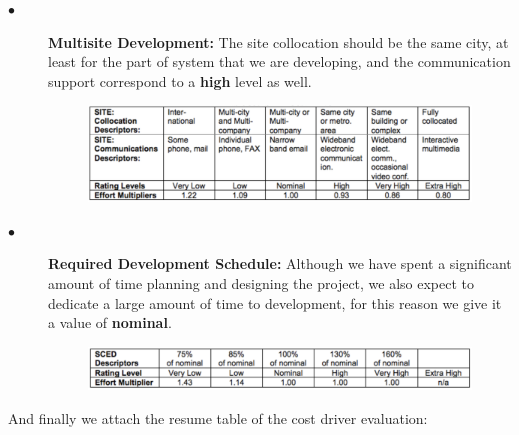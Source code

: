 \documentclass[a4paper,10pt]{article}
\begin{document}
\begin{description}
\begin{figure}[!h]
  \end{figure}\FloatBarrier
  \item[$\bullet$] \textbf{Multisite Development:} The site collocation should be the same city, at least for the part of system that we are developing, and the communication support correspond to a \textbf{high} level as well.
          \begin{figure}[!h]
  \centering
    \includegraphics[scale=0.32]{Resources/cocomo/site.png}
  \end{figure}\FloatBarrier
  \item[$\bullet$] \textbf{Required Development Schedule:} Although we have spent a significant amount of time planning and designing the project, we also expect to dedicate a large amount of time to development, for this reason we give it a value of \textbf{nominal}.
          \begin{figure}[!h]
  \centering
    \includegraphics[scale=0.32]{Resources/cocomo/sced.png}
  \end{figure}\FloatBarrier

\end{description}
    \bigskip And finally we attach the resume table of the cost driver evaluation:
\end{document}
